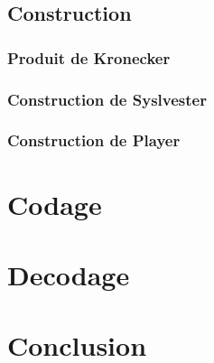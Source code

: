 \documentclass{article}
\begin{document}
\subsection{Construction}

\subsubsection{Produit de Kronecker}

\subsubsection{Construction de Syslvester}

\subsubsection{Construction de Player}

\section{Codage}

\section{Decodage}

\section{Conclusion}
\end{document}
